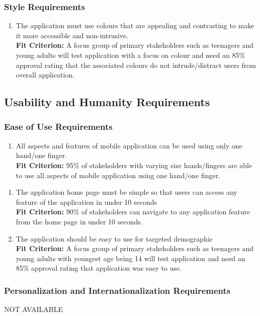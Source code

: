 \documentclass[12pt,letterpaper]{article}
\begin{document}
\subsubsection{Style Requirements}
\begin{enumerate}[resume*]  
	\item The application must use colours that are appealing and contrasting to make it more accessible and non-intrusive.\\
	{\textbf{Fit Criterion:} A focus group of primary stakeholders such as teenagers and young adults will test application with a focus on colour and need an 85\% approval rating that the associated colours do not intrude/distract users from overall application.}
\end{enumerate}

\subsection{Usability and Humanity Requirements}
\subsubsection{Ease of Use Requirements}
\begin{enumerate}[{UH}1.] 
	\item All aspects and features of mobile application can be used using only one hand/one finger.\\
	{\textbf{Fit Criterion:} 95\% of stakeholders with varying size hands/fingers are able to use all aspects of mobile application using one hand/one finger.}
\end{enumerate}
\begin{enumerate}[resume*]  
	\item The application home page must be simple so that users can access any feature of the application in under 10 seconds\\
	{\textbf{Fit Criterion:} 90\% of stakeholders can navigate to any application feature from the home page in under 10 seconds. }
	\item The application should be easy to use for targeted demographic\\
	{\textbf{Fit Criterion:} A focus group of primary stakeholders such as teenagers and young adults with youngest age being 14 will test application and need an 85\% approval rating that application was easy to use. }
\end{enumerate}

\subsubsection{Personalization and Internationalization Requirements}
\noindent NOT AVAILABLE
\end{document}
